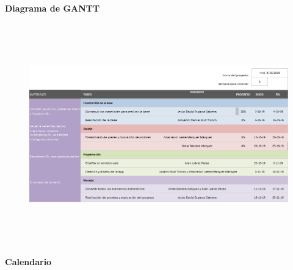 \documentclass[12pt]{article}
\begin{document}
\vspace{\baselineskip}

\vspace{\baselineskip}

\vspace{\baselineskip}

\vspace{\baselineskip}

\vspace{\baselineskip}
\textbf{Diagrama de GANTT }\par




\begin{figure}[H]
	\begin{Center}
		\includegraphics[width=7.11in,height=3.79in]{./media/image2.png}
	\end{Center}
\end{figure}




\par


\vspace{\baselineskip}
\textbf{Calendario }\par
\end{document}
